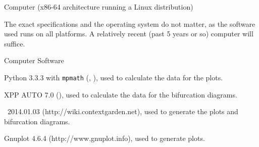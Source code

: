 \startitemize[1,joinedup]

  \startitem Computer (x86-64 architecture running a Linux distribution)

    \indenting[no] The exact specifications and the operating system do not
    matter, as the software used runs on all platforms. A relatively recent
    (past 5 years or so) computer will suffice.
  \stopitem

  \startitem Computer Software
    \startitemize[1,joinedup]
    \item Python 3.3.3 with {\tt mpmath}
      (,
      ), used to calculate the data for
      the plots.
    \item XPP AUTO 7.0
      (), used to
      calculate the data for the bifurcation diagrams.
    \item \CONTEXT \ 2014.01.03 (http://wiki.contextgarden.net), used to
      generate the plots and bifurcation diagrams.
    \item Gnuplot 4.6.4 (http://www.gnuplot.info), used to generate
      plots.
    \stopitemize
  \stopitem
\stopitemize
